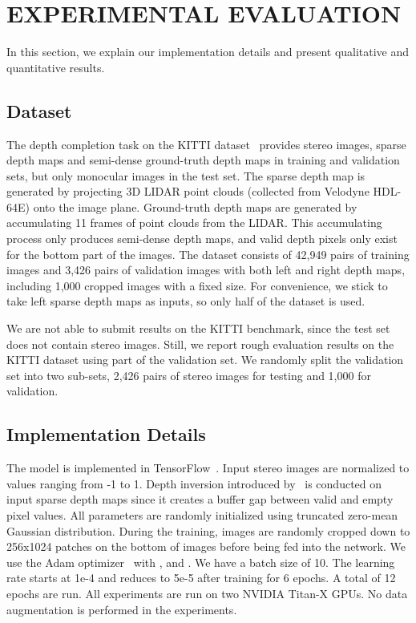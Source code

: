 \documentclass[letterpaper, 10 pt, conference]{ieeeconf}
\begin{document}
\section{EXPERIMENTAL EVALUATION}
In this section, we explain our implementation details and present qualitative and quantitative results.

\subsection{Dataset}
    The depth completion task on the KITTI dataset~\cite{sparsityCNN} provides stereo images, sparse depth maps and semi-dense ground-truth depth maps in training and validation sets, but only monocular images in the test set. The sparse depth map is generated by projecting 3D LIDAR point clouds (collected from Velodyne HDL-64E) onto the image plane. Ground-truth depth maps are generated by accumulating 11 frames of point clouds from the LIDAR. This accumulating process only produces semi-dense depth maps, and valid depth pixels only exist for the bottom part of the images. The dataset consists of 42,949 pairs of training images and 3,426 pairs of validation images with both left and right depth maps, including 1,000 cropped images with a fixed size. For convenience, we stick to take left sparse depth maps as inputs, so only half of the dataset is used.
    
    We are not able to submit results on the KITTI benchmark, since the test set does not contain stereo images. Still, we report rough evaluation results on the KITTI dataset using part of the validation set. We randomly split the validation set into two sub-sets, 2,426 pairs of stereo images for testing and 1,000 for validation.

\subsection{Implementation Details}
    The model is implemented in TensorFlow~\cite{tensorflow}. Input stereo images are normalized to values ranging from -1 to 1. Depth inversion introduced by~\cite{ku2018defense} is conducted on input sparse depth maps since it creates a buffer gap between valid and empty pixel values. All parameters are randomly initialized using truncated zero-mean Gaussian distribution. During the training, images are randomly cropped down to 256x1024 patches on the bottom of images before being fed into the network. We use the Adam optimizer~\cite{adam} with ,  and . We have a batch size of 10. The learning rate starts at 1e-4 and reduces to 5e-5 after training for 6 epochs. A total of 12 epochs are run. All experiments are run on two NVIDIA Titan-X GPUs. No data augmentation is performed in the experiments.  
\end{document}
